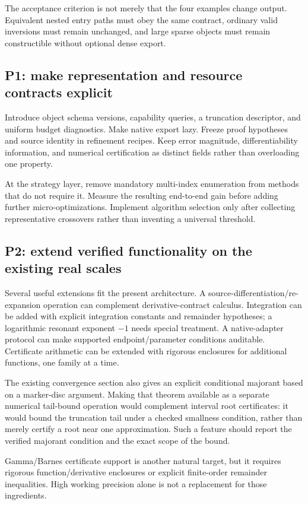\documentclass[11pt,a4paper]{article}
\newcommand{\code}[1]{\texttt{\detokenize{#1}}}
\begin{document}
The acceptance criterion is not merely that the four examples change output. Equivalent nested entry paths must obey the same contract, ordinary valid inversions must remain unchanged, and large sparse objects must remain constructible without optional dense export.

\subsection{P1: make representation and resource contracts explicit}
Introduce object schema versions, capability queries, a truncation descriptor, and uniform budget diagnostics. Make native export lazy. Freeze proof hypotheses and source identity in refinement recipes. Keep error magnitude, differentiability information, and numerical certification as distinct fields rather than overloading one \code{Remainder} property.

At the strategy layer, remove mandatory multi-index enumeration from methods that do not require it. Measure the resulting end-to-end gain before adding further micro-optimizations. Implement algorithm selection only after collecting representative crossovers rather than inventing a universal threshold.

\subsection{P2: extend verified functionality on the existing real scales}
Several useful extensions fit the present architecture. A source-differentiation/re-expansion operation can complement derivative-contract calculus. Integration can be added with explicit integration constants and remainder hypotheses; a logarithmic resonant exponent $-1$ needs special treatment. A native-adapter protocol can make supported endpoint/parameter conditions auditable. Certificate arithmetic can be extended with rigorous enclosures for additional functions, one family at a time.

The existing convergence section also gives an explicit conditional majorant based on a marker-disc argument. Making that theorem available as a separate numerical tail-bound operation would complement interval root certificates: it would bound the truncation tail under a checked smallness condition, rather than merely certify a root near one approximation. Such a feature should report the verified majorant condition and the exact scope of the bound.\cite{convergence,certificates}

Gamma/Barnes certificate support is another natural target, but it requires rigorous function/derivative enclosures or explicit finite-order remainder inequalities. High working precision alone is not a replacement for those ingredients.
\end{document}

